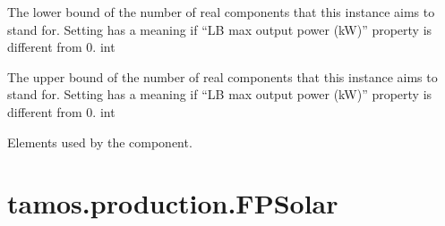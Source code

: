\documentclass[letterpaper,10pt,english]{sphinxmanual}
\begin{document}
\begin{fulllineitems}
\begin{fulllineitems}
\label{\detokenize{generated/tamos.production.ElementConverter:tamos.production.ElementConverter.units_number_lb}}
\pysigstartsignatures
{}
\pysigstopsignatures
\sphinxAtStartPar
The lower bound of the number of real components that this instance aims to stand for.
Setting  has a meaning if “LB max output power (kW)” property is different from 0.
int

\end{fulllineitems}


\begin{fulllineitems}
\label{\detokenize{generated/tamos.production.ElementConverter:tamos.production.ElementConverter.units_number_ub}}
\pysigstartsignatures
{}
\pysigstopsignatures
\sphinxAtStartPar
The upper bound of the number of real components that this instance aims to stand for.
Setting  has a meaning if “LB max output power (kW)” property is different from 0.
int

\end{fulllineitems}


\begin{fulllineitems}
\label{\detokenize{generated/tamos.production.ElementConverter:tamos.production.ElementConverter.used_elements}}
\pysigstartsignatures
{}
\pysigstopsignatures
\sphinxAtStartPar
Elements used by the component.

\end{fulllineitems}


\end{fulllineitems}


\sphinxstepscope


\section{tamos.production.FPSolar}
\label{\detokenize{generated/tamos.production.FPSolar:tamos-production-fpsolar}}\label{\detokenize{generated/tamos.production.FPSolar::doc}}
\end{document}
